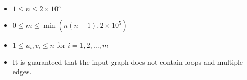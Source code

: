 \begin{itemize}
\tightlist
\item $1 \leq n \leq 2 \times 10 ^ 5$
\item $0 \leq m \leq \min(n(n - 1), 2 \times 10^5)$
\item $1 \leq u_i, v_i \leq n$ for $i = 1, 2, \ldots, m$
\item It is guaranteed that the input graph does not contain loops and multiple edges.
\end{itemize}
